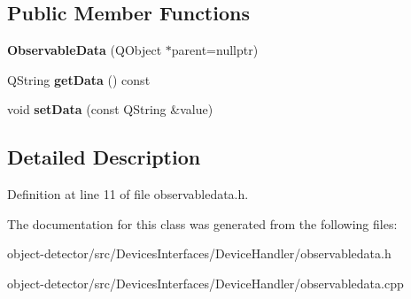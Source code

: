 \subsection*{Public Member Functions}
\begin{DoxyCompactItemize}
\item 
\mbox{\label{class_devices_1_1_observable_data_abb504c2ef0d30bcdf837d0d65ccb2051}} 
{\bfseries Observable\+Data} (Q\+Object $\ast$parent=nullptr)
\item 
\mbox{\label{class_devices_1_1_observable_data_a184c8f851ca0e0f527c7d4efea81b324}} 
Q\+String {\bfseries get\+Data} () const
\item 
\mbox{\label{class_devices_1_1_observable_data_a679da32e456f440f34131c807da3fbfd}} 
void {\bfseries set\+Data} (const Q\+String \&value)
\end{DoxyCompactItemize}


\subsection{Detailed Description}


Definition at line 11 of file observabledata.\+h.



The documentation for this class was generated from the following files\+:\begin{DoxyCompactItemize}
\item 
object-\/detector/src/\+Devices\+Interfaces/\+Device\+Handler/observabledata.\+h\item 
object-\/detector/src/\+Devices\+Interfaces/\+Device\+Handler/observabledata.\+cpp\end{DoxyCompactItemize}
